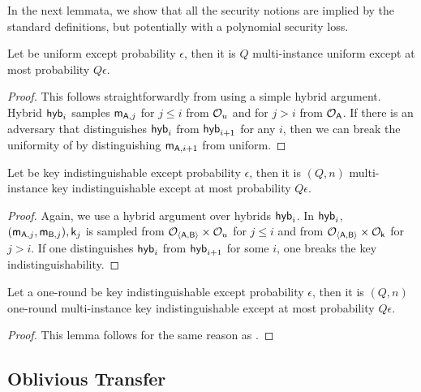 In the next lemmata, we show that all the security notions are implied by the standard definitions, but potentially with a polynomial security loss.
 
\begin{lemma}\label{lem:multuniform}
Let \UKA be uniform except probability $\epsilon$, then it is $Q$ multi-instance uniform except at most probability $Q\epsilon$.
\end{lemma}
\begin{proof}
This follows straightforwardly from using a simple hybrid argument. Hybrid $\mathsf{hyb}_{i}$ samples $\mathsf{m}_{\mathsf{A},j}$ for $j\leq i$ from $\mathcal{O}_u$ and for $j>i$ from $\mathcal{O}_{\mathsf{A}}$. If there is an adversary that distinguishes $\mathsf{hyb}_i$ from $\mathsf{hyb}_{i+1}$ for any $i$, then we can break the uniformity of \UKA by distinguishing $\mathsf{m}_{\mathsf{A},i+1}$ from uniform.  
\pe
\end{proof}

\begin{lemma}\label{lem:keytomultkey}
Let \UKA be key indistinguishable except probability $\epsilon$, then it is $(Q,n)$ multi-instance key indistinguishable except at most probability $Q\epsilon$. 
\end{lemma}

\begin{proof}
Again, we use a hybrid argument over hybrids $\mathsf{hyb}_i$. In $\mathsf{hyb}_i$, $(\mathsf{m}_{\mathsf{A},j},\mathsf{m}_{\mathsf{B},j}),\mathsf{k}_j$ is sampled from $\mathcal{O}_{\langle \mathsf{A},\mathsf{B}\rangle}\times\mathcal{O}_u$ for $j\leq i$ and from $\mathcal{O}_{\langle \mathsf{A},\mathsf{B}\rangle}\times\mathcal{O}_\mathsf{k}$ for $j>i$. If one distinguishes $\mathsf{hyb}_i$ from $\mathsf{hyb}_{i+1}$ for some $i$, one breaks the key indistinguishability. 
\pe
\end{proof}

\begin{lemma}\label{lem:oneroundkeytomultkey}
Let a one-round \UKA be key indistinguishable except probability $\epsilon$, then it is $(Q,n)$ one-round multi-instance key indistinguishable except at most probability $Q\epsilon$. 
\end{lemma}

\begin{proof}
This lemma follows for the same reason as .
\pe
\end{proof}


\subsection{Oblivious Transfer}\label{sec:addOT}



